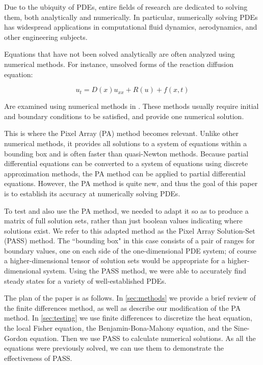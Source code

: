 \documentclass[11pt]{article}
\begin{document}
Due to the ubiquity of PDEs, entire fields of research are dedicated to solving them, both analytically and numerically. In particular, numerically solving PDEs has widespread applications in computational fluid dynamics, aerodynamics, and other engineering subjects. 

Equations that have not been solved analytically are often analyzed using numerical methods. For instance, unsolved forms of the reaction diffusion equation:

\begin{equation}
    \label{RD}
    u_t = D(x)u_{xx} + R(u) + f(x,t)
\end{equation}

Are examined using numerical methods in \citep{Numerical_RD_1, Numerical_RD_2, Numerical_RD_3}. These methods usually require initial and boundary conditions to be satisfied, and provide one numerical solution.

This is where the Pixel Array (PA) method \citep{Introduction_to_PA} becomes relevant. Unlike other numerical methods, it provides all solutions to a system of equations within a bounding box and is often faster than quasi-Newton methods. Because partial differential equations can be converted to a system of equations using discrete approximation methods, the PA method can be applied to partial differential equations. However, the PA method is quite new, and thus the goal of this paper is to establish its accuracy at numerically solving PDEs.

To test and also use the PA method, we needed to adapt it so as to produce a matrix of full solution sets, rather than just boolean values indicating where solutions exist. We refer to this adapted method as the Pixel Array Solution-Set (PASS) method. The ``bounding box" in this case consists of a pair of ranges for boundary values, one on each side of the one-dimensional PDE system; of course a higher-dimensional tensor of solution sets would be appropriate for a higher-dimensional system. Using the PASS method, we were able to accurately find steady states for a variety of well-established PDEs.

The plan of the paper is as follows. In \cref{sec:methods} we provide a brief review of the finite differences method, as well as describe our modification of the PA method. In \cref{sec:testing} we use finite differences to discretize the heat equation, the local Fisher equation, the Benjamin-Bona-Mahony equation, and the Sine-Gordon equation. Then we use PASS to calculate numerical solutions. As all the equations were previously solved, we can use them to demonstrate the effectiveness of PASS.
\end{document}
